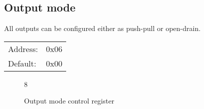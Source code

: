 \documentclass{article}
\begin{document}
	\subsection{Output mode}
	
	All outputs can be configured either as push-pull or open-drain.
	
	\begin{tabular}{ l c }
		Address: & 0x06 \\
		Default: & 0x00 \\
	\end{tabular}
	
	\begin{figure}[H]
		\centering
		\begin{bytefield}[
			bitwidth=0.1\linewidth]{8}
			 \\
		\end{bytefield}
		\caption{Output mode control register}
		\label{reg:output_mode}
	\end{figure}
	
\end{document}
